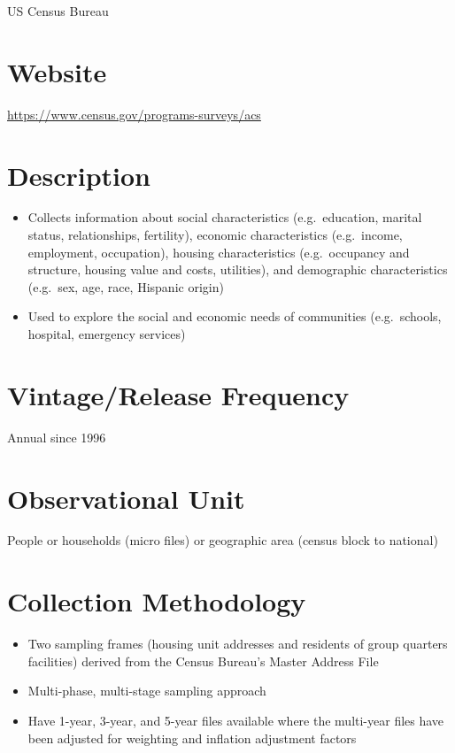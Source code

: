 \documentclass[
]{book}
\providecommand{\tightlist}{%
  \setlength{\itemsep}{0pt}\setlength{\parskip}{0pt}}
\begin{document}
US Census Bureau

\hypertarget{website-5}{%
\section{Website}\label{website-5}}

\url{https://www.census.gov/programs-surveys/acs}

\hypertarget{description-5}{%
\section{Description}\label{description-5}}

\begin{itemize}
\tightlist
\item
  Collects information about social characteristics (e.g.~education, marital status, relationships, fertility), economic characteristics (e.g.~income, employment, occupation), housing characteristics (e.g.~occupancy and structure, housing value and costs, utilities), and demographic characteristics (e.g.~sex, age, race, Hispanic origin)
\item
  Used to explore the social and economic needs of communities (e.g.~schools, hospital, emergency services)
\end{itemize}

\hypertarget{vintagerelease-frequency-5}{%
\section{Vintage/Release Frequency}\label{vintagerelease-frequency-5}}

Annual since 1996

\hypertarget{observational-unit-5}{%
\section{Observational Unit}\label{observational-unit-5}}

People or households (micro files) or geographic area (census block to national)

\hypertarget{collection-methodology-5}{%
\section{Collection Methodology}\label{collection-methodology-5}}

\begin{itemize}
\tightlist
\item
  Two sampling frames (housing unit addresses and residents of group quarters facilities) derived from the Census Bureau's Master Address File
\item
  Multi-phase, multi-stage sampling approach
\item
  Have 1-year, 3-year, and 5-year files available where the multi-year files have been adjusted for weighting and inflation adjustment factors
\end{itemize}
\end{document}
